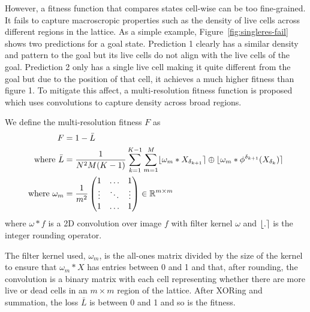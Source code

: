 However, a fitness function that compares states cell-wise can be too fine-grained. It fails to capture macroscropic properties such as the density of live cells across different regions in the lattice. As a simple example, Figure~\ref{fig:singleres-fail} shows two predictions for a goal state. Prediction 1 clearly has a similar density and pattern to the goal but its live cells do not align with the live cells of the goal. Prediction 2 only has a single live cell making it quite different from the goal but due to the position of that cell, it achieves a much higher fitness than figure 1. To mitigate this affect, a multi-resolution fitness function is proposed which uses convolutions to capture density across broad regions.\\

\begin{definition}
We define the multi-resolution fitness $F$ as
\begin{align*}
    F &= 1 - \bar{L}\\
    \textnormal{where\ } \bar{L} &= \frac{1}{N^2M(K-1)} \sum_{k=1}^{K-1} \sum_{m=1}^{M} \lfloor\omega_m \ast X_{\delta_{k+1}}\rceil \oplus \lfloor\omega_m \ast \phi^{\delta_{k+1}}(X_{\delta_k})\rceil\\
    \textnormal{where\ } \omega_m &= \frac{1}{m^2}
    \begin{pmatrix}
        1 & \ldots & 1\\
        \vdots & \ddots & \vdots\\
        1 & \ldots & 1\\
    \end{pmatrix}
    \in \mathbb{R}^{m \times m}
\end{align*}
where $\omega \ast f$ is a 2D convolution over image $f$ with filter kernel $\omega$ and $\lfloor.\rceil$ is the integer rounding operator.
\end{definition}

The filter kernel used, $\omega_m$, is the all-ones matrix divided by the size of the kernel to ensure that $\omega_m \ast X$ has entries between 0 and 1 and that, after rounding, the convolution is a binary matrix with each cell representing whether there are more live or dead cells in an $m \times m$ region of the lattice. After XORing and summation, the loss $\bar{L}$ is between 0 and 1 and so is the fitness.


